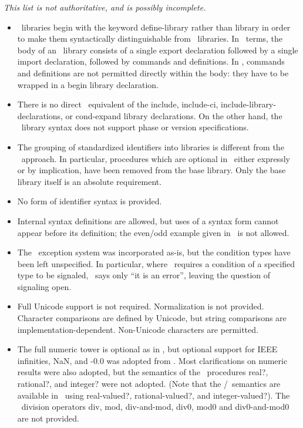 {\em This list is not authoritative, and is possibly incomplete.}

\begin{itemize}
\item \rsevenrs\ libraries begin with the keyword {\cf define-library}
rather than {\cf library} in order to make them syntactically
distinguishable from \rsixrs\ libraries.
In \rsevenrs\ terms, the body of an \rsixrs\ library consists
of a single export declaration followed by a single import declaration,
followed by commands and definitions.  In \rsevenrs, commands and
definitions are not permitted directly within the body: they have to be wrapped in a {\cf begin}
library declaration.

\item There is no direct \rsixrs\ equivalent of the {\cf include}, {\cf include-ci},
{\cf include-library-declarations}, or {\cf cond-expand} library declarations.
On the other hand, the \rsevenrs\ library syntax does not support phase or version specifications.

\item The grouping of standardized identifiers into libraries is different from the \rsixrs\
approach. In particular, procedures which are optional in \rfivers\, either expressly
or by implication, have been removed from the base library.
Only the base library itself is an absolute requirement.

\item No form of identifier syntax is provided. 

\item Internal syntax definitions are allowed, but uses of a syntax form
cannot appear before its definition; the {\cf even}/{\cf odd} example given in
\rsixrs\ is not allowed.

\item The \rsixrs\ exception system was incorporated as-is, but the condition
types have been left unspecified.  In particular, where \rsixrs\ requires
a condition of a specified type to be signaled, \rsevenrs\ says only
``it is an error'', leaving the question of signaling open.

\item Full Unicode support is not required.
Normalization is not provided.
Character comparisons are
defined by Unicode, but string comparisons are implementation-dependent.
Non-Unicode characters are permitted.

\item The full numeric tower is optional as in \rfivers, but optional support for IEEE
infinities, NaN, and {\mbox -0.0} was adopted from \rsixrs. Most clarifications on
numeric results were also adopted, but the semantics of the \rsixrs\ procedures {\cf real?},
{\cf rational?}, and {\cf integer}? were not adopted.
(Note that the \rfivers{}/\rsevenrs\ semantics are available in \rsixrs\ using
{\cf real-valued?}, {\cf rational-valued?}, and {\cf integer-valued?}).
The \rsixrs\ division operators {\cf div}, {\cf mod}, {\cf div-and-mod}, {\cf
div0}, {\cf mod0} and {\cf div0-and-mod0} are not provided.


\end{itemize}
